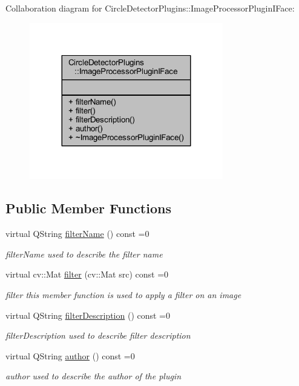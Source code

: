 Collaboration diagram for Circle\+Detector\+Plugins\+:\+:Image\+Processor\+Plugin\+I\+Face\+:\nopagebreak
\begin{figure}[H]
\begin{center}
\leavevmode
\includegraphics[width=239pt]{d0/d28/class_circle_detector_plugins_1_1_image_processor_plugin_i_face__coll__graph}
\end{center}
\end{figure}
\subsection*{Public Member Functions}
\begin{DoxyCompactItemize}
\item 
virtual Q\+String \hyperlink{class_circle_detector_plugins_1_1_image_processor_plugin_i_face_a278e7f8e8c7e50e566c65202de58d037}{filter\+Name} () const =0
\begin{DoxyCompactList}\small\item\em filter\+Name used to describe the filter name \end{DoxyCompactList}\item 
virtual cv\+::\+Mat \hyperlink{class_circle_detector_plugins_1_1_image_processor_plugin_i_face_a87e2023aca6dffc2ceace999b7ca6b0b}{filter} (cv\+::\+Mat src) const =0
\begin{DoxyCompactList}\small\item\em filter this member function is used to apply a filter on an image \end{DoxyCompactList}\item 
virtual Q\+String \hyperlink{class_circle_detector_plugins_1_1_image_processor_plugin_i_face_a5003fd77a4bb84befee299528241d4e5}{filter\+Description} () const =0
\begin{DoxyCompactList}\small\item\em filter\+Description used to describe filter description \end{DoxyCompactList}\item 
virtual Q\+String \hyperlink{class_circle_detector_plugins_1_1_image_processor_plugin_i_face_a74b5e4f7aa50140ecc4a94587fb3ed42}{author} () const =0
\begin{DoxyCompactList}\small\item\em author used to describe the author of the plugin \end{DoxyCompactList}\end{DoxyCompactItemize}


